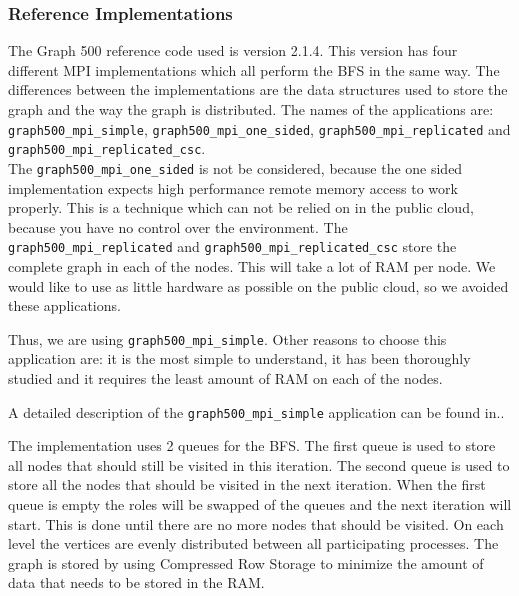 \subsubsection{Reference Implementations}

The Graph 500 reference code\cite{graph500-code} used is version 2.1.4. This version has four different MPI implementations which all perform the BFS in the same way. The differences between the implementations are the data structures used to store the graph and the way the graph is distributed. The names of the applications are: \texttt{graph500\_mpi\_simple}, \texttt{graph500\_mpi\_one\_sided}, \texttt{graph500\_mpi\_replicated} and \texttt{graph500\_mpi\_replicated\_csc}.
\\ 
The \texttt{graph500\_mpi\_one\_sided} is not be considered, because the one sided implementation expects high performance remote memory access to work properly. This is a technique which can not be relied on in the public cloud, because you have no control over the environment. The \texttt{graph500\_mpi\_replicated} and \texttt{graph500\_mpi\_replicated\_csc} store the complete graph in each of the nodes. This will take a lot of RAM per node. We would like to use as little hardware as possible on the public cloud, so we avoided these applications.

Thus, we are using \texttt{graph500\_mpi\_simple}. Other reasons to choose this application are: it is the most simple to understand, it has been thoroughly studied and it requires the least amount of RAM on each of the nodes. 

A detailed description of the \texttt{graph500\_mpi\_simple} application can be found in.\cite{suzumura2011performance}.

The implementation uses 2 queues for the BFS. The first queue is used to store all nodes that should still be visited in this iteration. The second queue is used to store all the nodes that should be visited in the next iteration. When the first queue is empty the roles will be swapped of the queues and the next iteration will start. This is done until there are no more nodes that should be visited. On each level the vertices are evenly distributed between all participating processes. The graph is stored by using Compressed Row Storage\cite{crs} to minimize the amount of data that needs to be stored in the RAM.

